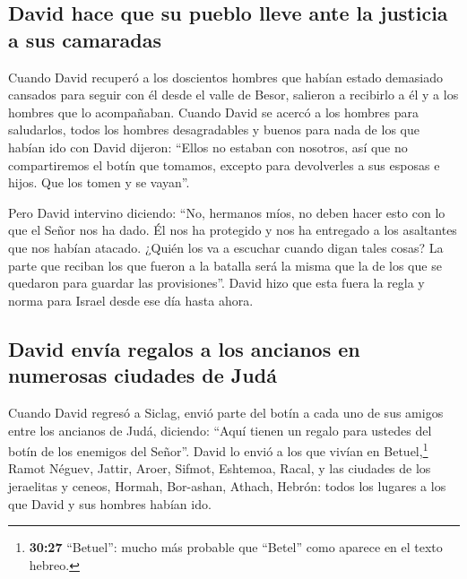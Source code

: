 \hypertarget{david-hace-que-su-pueblo-lleve-ante-la-justicia-a-sus-camaradas}{%
\subsection{David hace que su pueblo lleve ante la justicia a sus
camaradas}\label{david-hace-que-su-pueblo-lleve-ante-la-justicia-a-sus-camaradas}}

 Cuando David recuperó a los doscientos hombres que
habían estado demasiado cansados para seguir con él desde el valle de
Besor, salieron a recibirlo a él y a los hombres que lo acompañaban.
Cuando David se acercó a los hombres para saludarlos, 
todos los hombres desagradables y buenos para nada de los que habían ido
con David dijeron: ``Ellos no estaban con nosotros, así que no
compartiremos el botín que tomamos, excepto para devolverles a sus
esposas e hijos. Que los tomen y se vayan''.

 Pero David intervino diciendo: ``No, hermanos míos, no
deben hacer esto con lo que el Señor nos ha dado. Él nos ha protegido y
nos ha entregado a los asaltantes que nos habían atacado.
 ¿Quién los va a escuchar cuando digan tales cosas? La
parte que reciban los que fueron a la batalla será la misma que la de
los que se quedaron para guardar las provisiones''. 
David hizo que esta fuera la regla y norma para Israel desde ese día
hasta ahora.

\hypertarget{david-envuxeda-regalos-a-los-ancianos-en-numerosas-ciudades-de-juduxe1}{%
\subsection{David envía regalos a los ancianos en numerosas ciudades de
Judá}\label{david-envuxeda-regalos-a-los-ancianos-en-numerosas-ciudades-de-juduxe1}}

 Cuando David regresó a Siclag, envió parte del botín a
cada uno de sus amigos entre los ancianos de Judá, diciendo: ``Aquí
tienen un regalo para ustedes del botín de los enemigos del Señor''.
 David lo envió a los que vivían en Betuel,\footnote{\textbf{30:27}
  ``Betuel'': mucho más probable que ``Betel'' como aparece en el texto
  hebreo.} Ramot Néguev, Jattir,  Aroer, Sifmot,
Eshtemoa,  Racal, y las ciudades de los jeraelitas y
ceneos,  Hormah, Bor-ashan, Athach, 
Hebrón: todos los lugares a los que David y sus hombres habían ido.

